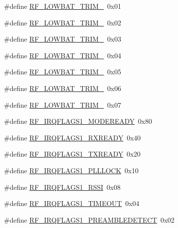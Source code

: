 \begin{DoxyCompactItemize}
\item 
\#define \mbox{\hyperlink{sx1276_regs-_fsk_8h_af835b4f1f8a866a42b09fa2e3f09c5cd}{R\+F\+\_\+\+L\+O\+W\+B\+A\+T\+\_\+\+T\+R\+I\+M\+\_}}~0x01
\item 
\#define \mbox{\hyperlink{sx1276_regs-_fsk_8h_ab0728e7072fa3d8924b464744703f078}{R\+F\+\_\+\+L\+O\+W\+B\+A\+T\+\_\+\+T\+R\+I\+M\+\_}}~0x02
\item 
\#define \mbox{\hyperlink{sx1276_regs-_fsk_8h_a7eecdc654023bc207f44edb51eadc593}{R\+F\+\_\+\+L\+O\+W\+B\+A\+T\+\_\+\+T\+R\+I\+M\+\_}}~0x03
\item 
\#define \mbox{\hyperlink{sx1276_regs-_fsk_8h_a460e532d54bd79a1403c4597e1fe00f9}{R\+F\+\_\+\+L\+O\+W\+B\+A\+T\+\_\+\+T\+R\+I\+M\+\_}}~0x04
\item 
\#define \mbox{\hyperlink{sx1276_regs-_fsk_8h_a1b4874343fe46f3e926ed05c244a418c}{R\+F\+\_\+\+L\+O\+W\+B\+A\+T\+\_\+\+T\+R\+I\+M\+\_}}~0x05
\item 
\#define \mbox{\hyperlink{sx1276_regs-_fsk_8h_ae5f2e0d03a4c5fa134faafcebc5fa522}{R\+F\+\_\+\+L\+O\+W\+B\+A\+T\+\_\+\+T\+R\+I\+M\+\_}}~0x06
\item 
\#define \mbox{\hyperlink{sx1276_regs-_fsk_8h_aabf95f34e7473a492e723c6adfffd368}{R\+F\+\_\+\+L\+O\+W\+B\+A\+T\+\_\+\+T\+R\+I\+M\+\_}}~0x07
\item 
\#define \mbox{\hyperlink{sx1276_regs-_fsk_8h_a9af03b2b868666a55780e8337c6e7497}{R\+F\+\_\+\+I\+R\+Q\+F\+L\+A\+G\+S1\+\_\+\+M\+O\+D\+E\+R\+E\+A\+DY}}~0x80
\item 
\#define \mbox{\hyperlink{sx1276_regs-_fsk_8h_ad4616b07e6107a520a6736e7d3759d3c}{R\+F\+\_\+\+I\+R\+Q\+F\+L\+A\+G\+S1\+\_\+\+R\+X\+R\+E\+A\+DY}}~0x40
\item 
\#define \mbox{\hyperlink{sx1276_regs-_fsk_8h_a465d49e932f278f59902789e70a3c713}{R\+F\+\_\+\+I\+R\+Q\+F\+L\+A\+G\+S1\+\_\+\+T\+X\+R\+E\+A\+DY}}~0x20
\item 
\#define \mbox{\hyperlink{sx1276_regs-_fsk_8h_afea7644a493f829a930c6a4f9bc7acee}{R\+F\+\_\+\+I\+R\+Q\+F\+L\+A\+G\+S1\+\_\+\+P\+L\+L\+L\+O\+CK}}~0x10
\item 
\#define \mbox{\hyperlink{sx1276_regs-_fsk_8h_acddf4bcd9ff43eac1edf8aa1e4f6c7ad}{R\+F\+\_\+\+I\+R\+Q\+F\+L\+A\+G\+S1\+\_\+\+R\+S\+SI}}~0x08
\item 
\#define \mbox{\hyperlink{sx1276_regs-_fsk_8h_ac8d3e1c751fe2a0ba644dab36cf01d41}{R\+F\+\_\+\+I\+R\+Q\+F\+L\+A\+G\+S1\+\_\+\+T\+I\+M\+E\+O\+UT}}~0x04
\item 
\#define \mbox{\hyperlink{sx1276_regs-_fsk_8h_af93b6a2656990eaaac6467e5b7bb900e}{R\+F\+\_\+\+I\+R\+Q\+F\+L\+A\+G\+S1\+\_\+\+P\+R\+E\+A\+M\+B\+L\+E\+D\+E\+T\+E\+CT}}~0x02

\end{DoxyCompactItemize}
